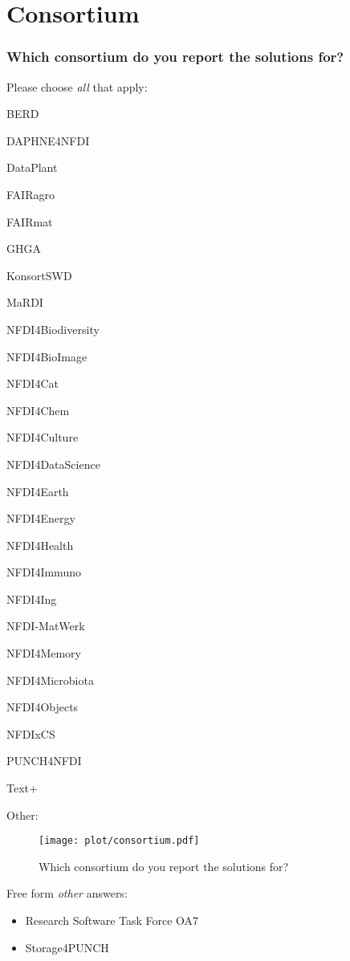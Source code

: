 \documentclass[headsepline,titlepage,twoside,12pt,toc=flat,headings=normal]{scrreprt}
\newcommand{\question}[1]{\subsubsection{#1}}
\newcommand{\otherbox}{\fbox{\phantom{This is how big an answer would be.}}}
\begin{document}
\section{Consortium}

\question{Which consortium do you report the solutions for?}

Please choose \emph{all} that apply:

\begin{answers}
\item \acs{BERD}
\item DAPHNE4NFDI
\item DataPlant
\item \acs{FAIRagro}
\item \acs{FAIRmat}
\item \acs{GHGA}
\item KonsortSWD
\item \acs{MaRDI}
\item NFDI4Biodiversity
\item NFDI4BioImage
\item NFDI4Cat
\item NFDI4Chem
\item NFDI4Culture
\item NFDI4DataScience
\item NFDI4Earth
\item NFDI4Energy
\item NFDI4Health
\item NFDI4Immuno
\item NFDI4Ing
\item NFDI-MatWerk
\item NFDI4Memory
\item NFDI4Microbiota
\item NFDI4Objects
\item NFDIxCS
\item \acs{PUNCH}4NFDI
\item Text+
\item Other: \otherbox
\end{answers}

\begin{figure}[h!]
\caption{Which consortium do you report the solutions for?}
\label{fig:consortium}
\texttt{[image: plot/consortium.pdf]}
\end{figure}

Free form \emph{other} answers:
\begin{itemize}
\item Research Software Task Force OA7
\item Storage4PUNCH
\end{itemize}
\end{document}
